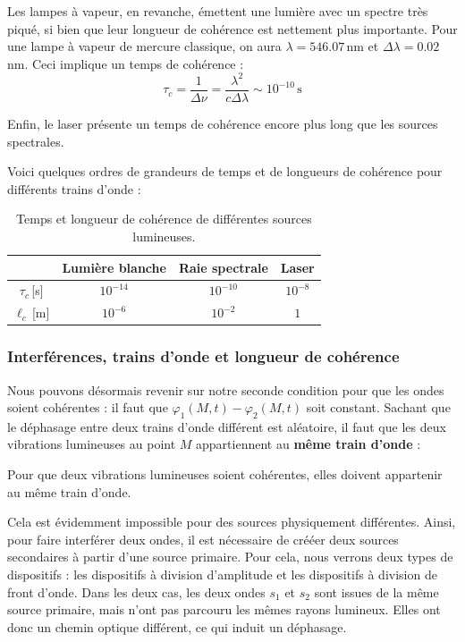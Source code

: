 \documentclass[11pt,fleqn]{book} %
\begin{document}
Les lampes à vapeur, en revanche, émettent une lumière avec un spectre très piqué, si bien que leur longueur de cohérence est nettement plus importante. Pour une lampe à vapeur de mercure classique, on aura $\lambda = 546.07$\,nm et $\Delta \lambda = 0.02$\,nm. Ceci implique un temps de cohérence :
\begin{equation}
	\tau_c = \frac{1}{\Delta \nu} = \frac{\lambda^2}{c \Delta \lambda} \sim 10^{-10}\,\mathrm{s}
\end{equation}

Enfin, le laser présente un temps de cohérence encore plus long que les sources spectrales.

Voici quelques ordres de grandeurs de temps et de longueurs de cohérence pour différents trains d'onde :
\begin{table}[h]
	\centering \begin{tabular}{cccc}
		\toprule
		&Lumière blanche & Raie spectrale & Laser \\
		\midrule
		$\tau_c$\,[s] & $10^{-14}$ & $10^{-10}$ & $10^{-8}$ \\
		$\ell_c$\,[m] & $10^{-6}$ & $10^{-2}$ & $1$ \\
		\bottomrule
	\end{tabular}
	\caption{Temps et longueur de cohérence de différentes sources lumineuses.}
\end{table}

\subsubsection{Interférences, trains d'onde et longueur de cohérence}

Nous pouvons désormais revenir sur notre seconde condition pour que les ondes soient cohérentes : il faut que $\varphi_1(M,t) - \varphi_2(M,t)$ soit constant. Sachant que le déphasage entre deux trains d'onde différent est aléatoire, il faut que les deux vibrations lumineuses au point $M$ appartiennent au \textbf{même train d'onde} :
\begin{proposition}
	Pour que deux vibrations lumineuses soient cohérentes, elles doivent appartenir au même train d'onde.
\end{proposition}

Cela est évidemment impossible pour des sources physiquement différentes. Ainsi, pour faire interférer deux ondes, il est nécessaire de crééer deux sources secondaires à partir d'une source primaire. Pour cela, nous verrons deux types de dispositifs : les dispositifs à division d'amplitude et les dispositifs à division de front d'onde. Dans les deux cas, les deux ondes $s_1$ et $s_2$ sont issues de la même source primaire, mais n'ont pas parcouru les mêmes rayons lumineux. Elles ont donc un chemin optique différent, ce qui induit un déphasage.
\end{document}
